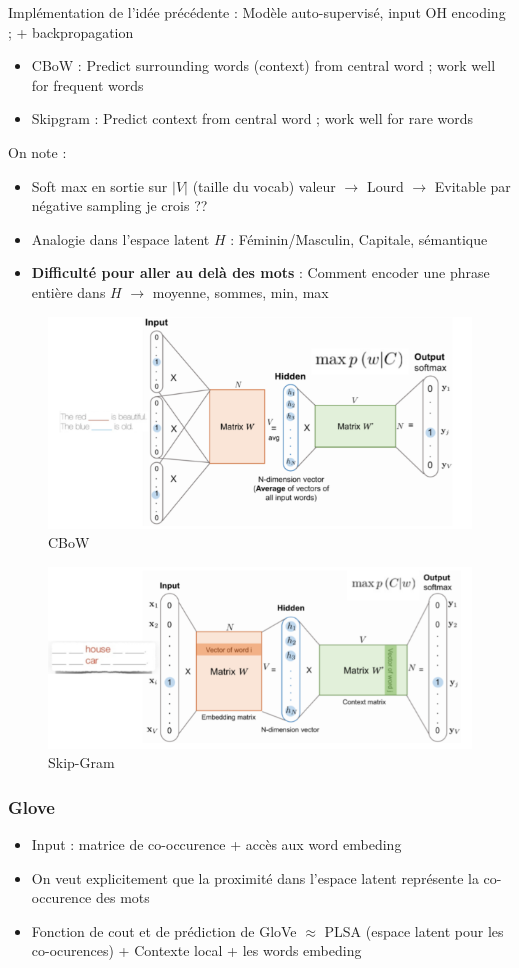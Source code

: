 \documentclass{article}
\theoremstyle{plain}%
\theoremstyle{definition}
\theoremstyle{remark}
\begin{document}
Implémentation de l'idée précédente : Modèle auto-supervisé, input OH encoding ; + backpropagation 
\begin{itemize}
    \item CBoW : Predict surrounding words (context) from central word ; work well for frequent words
    \item Skipgram : Predict context from central word ; work well for rare words
\end{itemize}
On note : \begin{itemize}
    \item Soft max en sortie sur $ \left| V \right|  $ (taille du vocab) valeur $\rightarrow$ Lourd $\rightarrow$ Evitable par négative sampling je crois ??
    \item Analogie dans l'espace latent $ H $ : Féminin/Masculin, Capitale, sémantique 
    \item \textbf{Difficulté pour aller au delà des mots} : Comment encoder une phrase entière dans $H$ $\rightarrow$ moyenne, sommes, min, max
\end{itemize}

\begin{figure}[htbp]
    \centering
    \includegraphics*[width=.75\textwidth]{CBoW.png}
    \caption{CBoW}
\end{figure}
\begin{figure}[htbp]
    \centering
    \includegraphics*[width=.75\textwidth]{skipgram.png}
    \caption{Skip-Gram}
\end{figure}

\subsubsection{Glove}
\begin{itemize}
    \item Input : matrice de co-occurence + accès aux word embeding
    \item On veut explicitement que la proximité dans l'espace latent représente la co-occurence des mots
    \item Fonction de cout et de prédiction de GloVe $ \approx  $ PLSA (espace latent pour les co-ocurences) + Contexte local + les words embeding 
\end{itemize}
\end{document}
